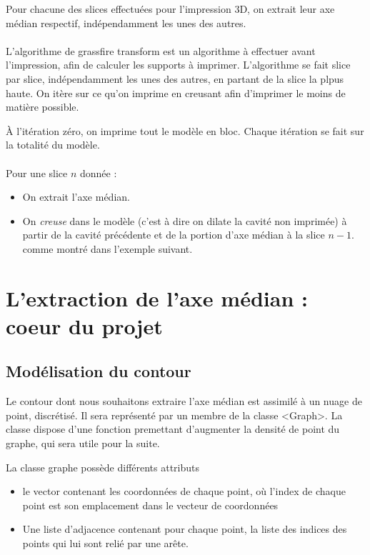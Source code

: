 \documentclass[11pt]{article}
\begin{document}
Pour chacune des slices effectuées pour l'impression 3D, on extrait leur axe médian respectif, indépendamment les unes des autres.
\paragraph*{}
L'algorithme de grassfire transform est un algorithme à effectuer avant l'impression, afin de calculer les supports à imprimer. L'algorithme se fait slice par slice, indépendamment les unes des autres, en partant de la slice la plpus haute. On itère sur ce qu'on imprime en creusant afin d'imprimer le moins de matière possible.

À l'itération zéro, on imprime tout le modèle en bloc. Chaque itération se fait sur la totalité du modèle. 

\paragraph*{} Pour une slice $n$ donnée :
\begin{itemize}
\item On extrait l'axe médian.
\item On \textit{creuse} dans le modèle (c'est à dire on dilate la cavité non imprimée) à partir de la cavité précédente et de la portion d'axe médian à la slice $n-1$. comme montré dans l'exemple suivant.
\end{itemize}

\section{L'extraction de l'axe médian : coeur du projet}

\subsection{Modélisation du contour}

Le contour dont nous souhaitons extraire l'axe médian est assimilé à un nuage de point, discrétisé. Il sera représenté par un membre de la classe <Graph>. La classe dispose d'une fonction premettant d'augmenter la densité de point du graphe, qui sera utile pour la suite.

La classe graphe possède différents attributs \begin{itemize}
\item le vector contenant les coordonnées de chaque point, où l'index de chaque point est son emplacement dans le vecteur de coordonnées

\item Une liste d'adjacence contenant pour chaque point, la liste des indices des points qui lui sont relié par une arête.
\end{itemize}
\end{document}
